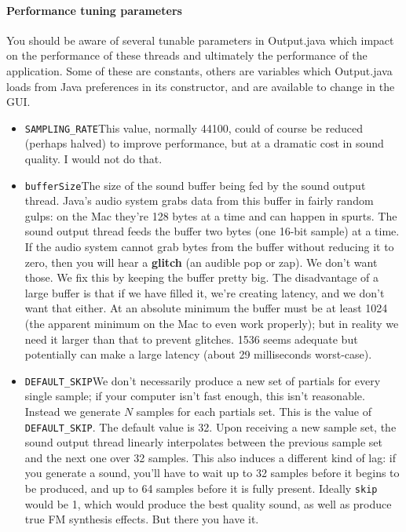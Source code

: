 \documentclass{article}
\begin{document}
\paragraph{Performance tuning parameters} You should be aware of several tunable parameters in Output.java which impact on the performance of these threads and ultimately the performance of the application.  Some of these are constants, others are variables which Output.java loads from Java preferences in its constructor, and are available to change in the GUI.

\begin{itemize}
\item {\tt SAMPLING\_RATE}\qquad This value, normally 44100, could of course be reduced (perhaps halved) to improve performance, but at a dramatic cost in sound quality.  I would not do that.

\item {\tt bufferSize}\qquad The size of the sound buffer being fed by the sound output thread.  Java's audio system grabs data from this buffer in fairly random gulps: on the Mac they're 128 bytes at a time and can happen in spurts.  The sound output thread feeds the buffer two bytes (one 16-bit sample) at a time.  If the audio system cannot grab bytes from the buffer without reducing it to zero, then you will hear a {\bf glitch} (an audible pop or zap).  We don't want those.  We fix this by keeping the buffer pretty big.  The disadvantage of a large buffer is that if we have filled it, we're creating latency, and we don't want that either.  At an absolute minimum the buffer must be at least 1024 (the apparent minimum on the Mac to even work properly); but in reality we need it larger than that to prevent glitches.  1536 seems adequate but potentially can make a large latency (about 29 milliseconds worst-case).

\item {\tt DEFAULT\_SKIP}\qquad We don't necessarily produce a new set of partials for every single sample; if your computer isn't fast enough, this isn't reasonable.  Instead we generate \(N\) samples for each partials set.  This is the value of {\tt DEFAULT\_SKIP}.  The default value is 32.  Upon receiving a new sample set, the sound output thread linearly interpolates between the previous sample set and the next one over 32 samples.  This also induces a different kind of lag: if you generate a sound, you'll have to wait up to 32 samples before it begins to be produced, and up to 64 samples before it is fully present.  Ideally {\tt skip} would be 1, which would produce the best quality sound, as well as produce true FM synthesis effects.  But there you have it.


\end{itemize}
\end{document}
